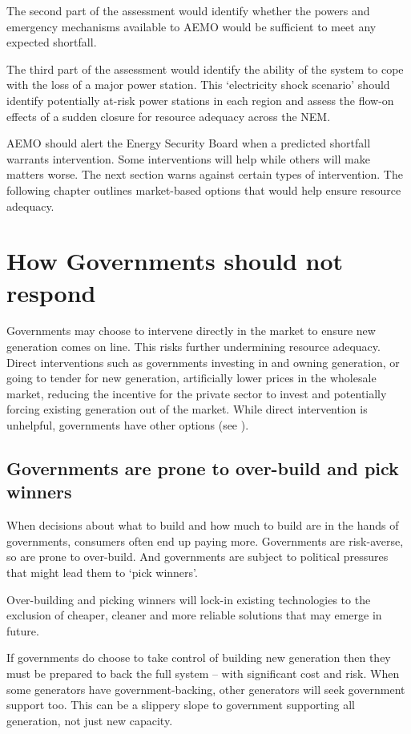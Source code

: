\documentclass[FrontPage]{grattan}
\begin{document}
The second part of the assessment would identify whether the powers and emergency mechanisms available to AEMO would be sufficient to meet any expected shortfall.

The third part of the assessment would identify the ability of the system to cope with the loss of a major power station. This `electricity shock scenario' should identify potentially at-risk power stations in each region and assess the flow-on effects of a sudden closure for resource adequacy across the NEM\@.

AEMO should alert the Energy Security Board when a predicted shortfall warrants intervention. Some interventions will help while others will make matters worse. The next section warns against certain types of intervention. The following chapter outlines market-based options that would help ensure resource adequacy.


\section{How Governments should not respond}\label{sec:how-governments-should-not-respond}
Governments may choose to intervene directly in the market to ensure new generation comes on line. This risks further undermining resource adequacy. Direct interventions such as governments investing in and owning generation, or going to tender for new generation, artificially lower prices in the wholesale market, reducing the incentive for the private sector to invest and potentially forcing existing generation out of the market. While direct intervention is unhelpful, governments have other options (see ).

\subsection{Governments are prone to over-build and pick winners}\label{subsec:governments-prone-to-over-build-and-pick-winners}
When decisions about what to build and how much to build are in the hands of governments, consumers often end up paying more. Governments are risk-averse, so are prone to over-build. And governments are subject to political pressures that might lead them to `pick winners'.

Over-building and picking winners will lock-in existing technologies to the exclusion of cheaper, cleaner and more reliable solutions that may emerge in future.

If governments do choose to take control of building new generation then they must be prepared to back the full system -- with significant cost and risk. When some generators have government-backing, other generators will seek government support too. This can be a slippery slope to government supporting all generation, not just new capacity.
\end{document}
